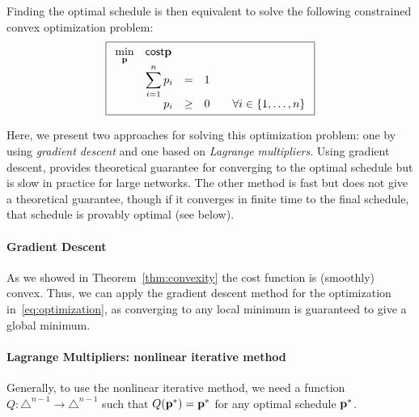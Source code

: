 
Finding the optimal schedule is then equivalent to solve the following
constrained convex optimization problem:
\begin{equation}\label{eq:optimization}
	\boxed{
	\begin{array}{rrclcl}
	\displaystyle \min_{\sched} & \multicolumn{3}{l}{\cost{\sched}} \\
	&\displaystyle \sum_{i=1}^{n} p_i & = & 1 \\
	&p_i & \geq & 0 & & \forall i \in \{1,\ldots,n\} \\
	\end{array} }
\end{equation}

Here, we present two approaches for solving this optimization problem: one by
using \emph{gradient descent} and one based on \emph{Lagrange multipliers}.
Using gradient descent, provides theoretical guarantee for converging to the
optimal schedule but is slow in practice for large networks. The other method is
fast but does not give a theoretical guarantee, though if it converges in finite
time to the final schedule, that schedule is provably optimal (see below).




\paragraph{Gradient Descent} As we showed in Theorem~\ref{thm:convexity}
the cost function is  (smoothly) convex. Thus, we can apply the gradient descent
method for the optimization in~\eqref{eq:optimization}, as converging to any
local minimum is guaranteed to give a global minimum.

\paragraph{Lagrange Multipliers: nonlinear iterative method} Generally, to use
the nonlinear iterative method, we need a function $Q:\triangle^{n-1}\rightarrow
\triangle^{n-1}$ such that $Q(\mathbf{p}^*) = \mathbf{p}^*$ for any optimal schedule $\mathbf{p}^*$.

